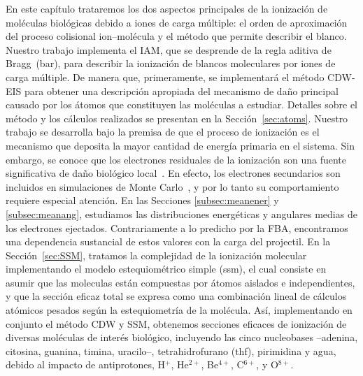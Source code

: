 En este capítulo trataremos los dos aspectos principales de la ionización 
de moléculas biológicas debido a iones de carga múltiple: el orden de 
aproximación del proceso colisional ion--molécula y el método que permite
describir el blanco. Nuestro trabajo implementa el IAM, que se desprende 
de la regla aditiva de Bragg~(\acs{bar}), para describir la ionización de 
blancos moleculares por iones de carga múltiple. De manera que, 
primeramente, se implementará el método CDW-EIS para obtener una 
descripción apropiada del mecanismo de daño principal causado por los 
átomos que constituyen las moléculas a estudiar. Detalles sobre el método 
y los cálculos realizados se presentan en la Sección~\ref{sec:atoms}. 
Nuestro trabajo se desarrolla bajo la premisa de que el proceso de 
ionización es el mecanismo que deposita la mayor cantidad de energía 
primaria en el sistema. Sin embargo, se conoce que los electrones 
residuales de la ionización son una fuente significativa de daño 
biológico local~\cite{Denifl:11}. En efecto, los electrones secundarios 
son incluidos en simulaciones de Monte Carlo~\cite{Champion:16,Quinto:17,
Acocer-Avila:19}, y por lo tanto su comportamiento requiere especial 
atención. En las Secciones \ref{subsec:meanener} y \ref{subsec:meanang}, 
estudiamos las distribuciones energéticas y angulares medias de los 
electrones ejectados. Contrariamente a lo predicho por la FBA, 
encontramos una dependencia sustancial de estos valores con la carga del 
projectil. 
En la Sección~\ref{sec:SSM}, tratamos la complejidad de la ionización 
molecular implementando el modelo estequiométrico simple (\acs{ssm}), el 
cual consiste en asumir que las moleculas están compuestas por átomos 
aislados e independientes, y que la sección eficaz total se expresa como 
una combinación lineal de cálculos atómicos pesados según la 
estequiometría de la molécula. Así, implementando en conjunto el método 
CDW y SSM, obtenemos secciones eficaces de ionización de diversas 
moléculas de interés biológico, incluyendo las cinco nucleobases 
--adenina, citosina, guanina, timina, uracilo--, tetrahidrofurano 
(\acs{thf}), pirimidina y agua, debido al impacto de antiprotones, 
H$^{+}$, He$^{2+}$, Be$^{4+}$, C$^{6+}$, y O$^{8+}$. 

